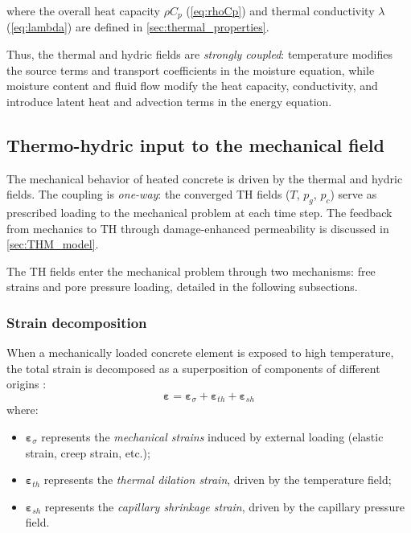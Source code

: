where the overall heat capacity $\rho C_p$ (\cref{eq:rhoCp}) and thermal conductivity $\lambda$ (\cref{eq:lambda}) are defined in \cref{sec:thermal_properties}.

Thus, the thermal and hydric fields are \textit{strongly coupled}: temperature modifies the source terms and transport coefficients in the moisture equation, while moisture content and fluid flow modify the heat capacity, conductivity, and introduce latent heat and advection terms in the energy equation.

\subsection{Thermo-hydric input to the mechanical field} \label{sec:THM_coupling}

The mechanical behavior of heated concrete is driven by the thermal and hydric fields. The coupling is \textit{one-way}: the converged TH fields ($T$, $p_g$, $p_c$) serve as prescribed loading to the mechanical problem at each time step. The feedback from mechanics to TH through damage-enhanced permeability is discussed in \cref{sec:THM_model}.

The TH fields enter the mechanical problem through two mechanisms: free strains and pore pressure loading, detailed in the following subsections.

\subsubsection{Strain decomposition}

When a mechanically loaded concrete element is exposed to high temperature, the total strain is decomposed as a superposition of components of different origins \cite{dauti2018}:
\begin{equation}
    \boldsymbol{\varepsilon} = \boldsymbol{\varepsilon}_\sigma + \boldsymbol{\varepsilon}_{th} + \boldsymbol{\varepsilon}_{sh}
    \label{eq:strain_decomp}
\end{equation}
where:
\begin{itemize}
    \item $\boldsymbol{\varepsilon}_\sigma$ represents the \textit{mechanical strains} induced by external loading  (elastic strain, creep strain, etc.);
    \item $\boldsymbol{\varepsilon}_{th}$ represents the \textit{thermal dilation strain}, driven by the temperature field;
    \item $\boldsymbol{\varepsilon}_{sh}$ represents the \textit{capillary shrinkage strain}, driven by the capillary pressure field.
\end{itemize}

